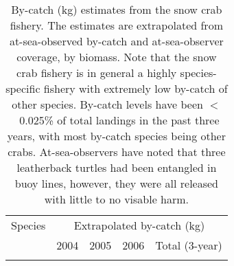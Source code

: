 \documentclass[11pt]{article}
\begin{document}
\begin{table}
\caption{By-catch (kg) estimates from the snow crab fishery. The estimates are extrapolated from at-sea-observed by-catch and at-sea-observer coverage, by biomass. Note that the snow crab fishery is in general a highly species-specific fishery with extremely low by-catch of other species. By-catch levels have been $<$~0.025\%  of total landings in the past three years, with most by-catch species being other crabs. At-sea-observers have noted that three leatherback turtles had been entangled in buoy lines, however, they were all released with little to no visable harm. }
\label{table.bycatch}
\begin{center}
\begin{tabular}{lrrrr}
  
  \hline\hline
  
  \multicolumn{1}{l}{Species} &
  \multicolumn{4}{c}{Extrapolated by-catch (kg)}

  \\

  \multicolumn{1}{l}{} &
  \multicolumn{1}{r}{2004}&
  \multicolumn{1}{r}{2005}&
  \multicolumn{1}{r}{2006}&
  \multicolumn{1}{r}{Total (3-year)}

  \\ 
  \hline
  \\


\end{tabular}
\end{center}
\end{table}
\end{document}
